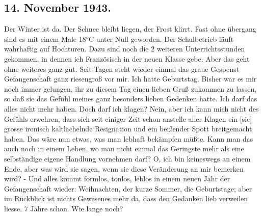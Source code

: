 \subsection{14. November 1943.}

Der Winter ist da.
Der Schnee bleibt liegen, der Frost klirrt.
Fast ohne \"{u}bergang sind es mit einem Male 18°C unter Null geworden.
Der Schulbetrieb l\"{a}uft wahrhaftig auf Hochturen.
Dazu sind noch die 2 weiteren Unterrichtsstunden gekommen, in dennen ich Franz\"{o}sisch in der neuen Klasse gebe.
Aber das geht ohne weiteres ganz gut.
Seit Tagen steht wieder einmal das graue Gespenst Gefangenschaft ganz riesengro{\ss} vor mir.
Ich hatte Geburtstag.
Bisher war es mir noch immer gelungen, ihr zu diesem Tag einen lieben Gru{\ss} zukommen zu lassen, so da{\ss} sie das Gef\"{u}hl meines ganz besonders lieben Gedenken hatte.
Ich darf das alles nicht mehr haben.
Doch darf ich klagen?
Nein, aber ich kann mich nicht des Gef\"{u}hls erwehren, dass sich seit einiger Zeit schon anstelle aller Klagen ein{\color{red} [sic] } grosse ironisch kaltl\"{a}chelnde Resignation und ein bei{\ss}ender Spott breitgemacht haben.
Das w\"{a}re nun etwas, was man lebhaft bek\"{a}mpfen m\"{u}{\ss}te.
Kann man das auch noch in einem Leben, wo man nicht einmal das Geringste mehr als eine selbst\"{a}ndige eigene Handlung vornehmen darf?
O, ich bin keineswegs an einem Ende, aber was wird sie sagen, wenn sie diese Ver\"{a}nderung an mir bemerken wird?
- Und alles kommt formlos, tonlos, leblos in einem neuen Jahr der Gefangenschaft wieder: Weihnachten, der kurze Sommer, die Geburtstage; aber im R\"{u}ckblick ist nichts Gewesenes mehr da, dass den Gedanken lieb verweilen liesse.
7 Jahre schon.
Wie lange noch?

\clearpage
